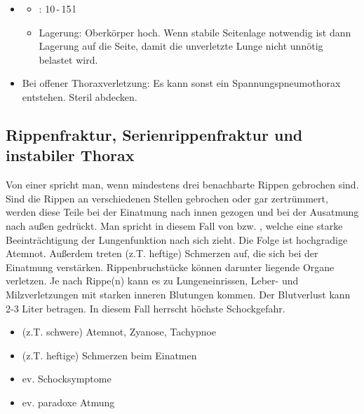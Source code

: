 {
\begin{itemize}
  \item \TxMassVitBes
  \begin{itemize}
    \item {}: 10\,-\,15\,l
    \item Lagerung: Oberkörper hoch. Wenn stabile
    Seitenlage notwendig ist dann Lagerung auf die
     Seite, damit die unverletzte
    Lunge  nicht unnötig belastet wird.
  \end{itemize}
  \item Bei offener Thoraxverletzung:  Es kann sonst ein
  Spannungspneumothorax entstehen. Steril abdecken.
\end{itemize}
}




\subsection{Rippenfraktur, Serienrippenfraktur und instabiler Thorax}
\label{topic:serienrippenfraktur}

{
Von einer  spricht man,
wenn mindestens drei benachbarte Rippen gebrochen sind. Sind
die Rippen an verschiedenen Stellen gebrochen oder gar
zertrümmert, werden diese Teile bei der Einatmung nach innen
gezogen und bei der Ausatmung nach außen gedrückt. Man
spricht in diesem Fall von  bzw.
, welche eine starke Beeinträchtigung
der Lungenfunktion nach sich zieht. Die Folge ist hochgradige
Atemnot. Außerdem treten (z.T. heftige) Schmerzen auf, die
sich bei der Einatmung verstärken. Rippenbruchstücke können
darunter liegende Organe verletzen. Je nach Rippe(n) kann es
zu Lungeneinrissen, Leber- und Milzverletzungen mit starken
inneren Blutungen kommen. Der Blutverlust kann 2-3 Liter
betragen. \cite{LPN3} In diesem Fall herrscht höchste
Schockgefahr.
}{
\begin{itemize}
  \item (z.T. schwere) Atemnot, Zyanose, Tachypnoe
  \item (z.T. heftige) Schmerzen beim Einatmen
  \item ev. Schocksymptome
  \item ev. paradoxe Atmung
\end{itemize}
}{}{}{}

